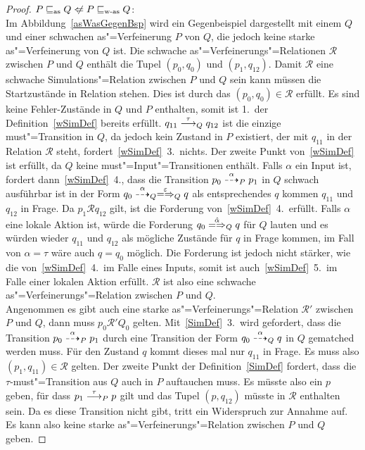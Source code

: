 \begin{proof}
  $P\asRel Q\hspace{0.1cm}\not\hspace{-0.1cm}\Leftarrow P\wasRel Q$:\\
  Im Abbildung~\ref{asWasGegenBsp} wird ein Gegenbeispiel dargestellt mit einem
  \MEIO{} $Q$ und einer schwachen as"=Verfeinerung $P$ von $Q$, die jedoch
  keine starke as"=Verfeinerung von $Q$ ist. Die schwache
  as"=Verfeinerungs"=Relationen $\mathcal{R}$ zwischen $P$ und $Q$ enthält die
  Tupel $(p_0,q_0)$ und $(p_1,q_{12})$. Damit $\mathcal{R}$ eine schwache
  Simulations"=Relation zwischen $P$ und $Q$ sein kann müssen die Startzustände
  in Relation stehen. Dies ist durch das $(p_0,q_0)\in \mathcal{R}$ erfüllt.
  Es sind keine Fehler-Zustände in $Q$ und $P$ enthalten, somit ist 1.\ der
  Definition~\ref{wSimDef} bereits erfüllt. $q_{11} \must[\tau]_Q q_{12}$ ist
  die einzige must"=Transition in $Q$, da jedoch kein Zustand in $P$ existiert,
  der mit $q_{11}$ in der Relation $\mathcal{R}$ steht,
  fordert~\ref{wSimDef}~3.\ nichts. Der zweite Punkt von~\ref{wSimDef} ist
  erfüllt, da $Q$ keine must"=Input"=Transitionen enthält. Falls $\alpha$ ein
  Input ist, fordert dann~\ref{wSimDef}~4., dass die Transition $p_0
  \may[\alpha]_P p_1$ in $Q$ schwach ausführbar ist in der Form $q_0
  \may[\alpha]_Q \weakmay[\varepsilon]_Q q$ als entsprechendes $q$ kommen
  $q_{11}$ und $q_{12}$ in Frage. Da $p_1 \mathcal{R} q_{12}$ gilt, ist die
  Forderung von~\ref{wSimDef}~4.\ erfüllt. Falls $\alpha$ eine lokale Aktion
  ist, würde die Forderung $q_0 \weakmay[\hat{\alpha}]_Q q$ für $Q$ lauten und
  es würden wieder $q_{11}$ und $q_{12}$ als mögliche Zustände für $q$ in Frage
  kommen, im Fall von $\alpha = \tau$ wäre auch $q = q_0$ möglich. Die
  Forderung ist jedoch nicht stärker, wie die von~\ref{wSimDef}~4.\ im Falle
  eines Inputs, somit ist auch~\ref{wSimDef}~5.\ im Falle einer lokalen Aktion
  erfüllt. $\mathcal{R}$ ist also eine schwache as"=Verfeinerungs"=Relation
  zwischen $P$ und $Q$.\\
  Angenommen es gibt auch eine starke as"=Verfeinerungs"=Relation
  $\mathcal{R}'$ zwischen $P$ und $Q$, dann muss $p_0 \mathcal{R}' Q_0$
  gelten. Mit~\ref{SimDef}~3.\ wird gefordert, dass die Transition $p_0
  \may[\alpha]_P p_1$ durch eine Transition der Form $q_0 \may[\alpha]_Q q$
  in $Q$ gematched werden muss. Für den Zustand $q$ kommt dieses mal nur
  $q_{11}$ in Frage. Es muss also $(p_1,q_{11})\in \mathcal{R}$ gelten. Der
  zweite Punkt der Definition~\ref{SimDef} fordert, dass die
  $\tau$-must"=Transition aus $Q$ auch in $P$ auftauchen muss. Es müsste also
  ein $p$ geben, für dass $p_1 \must[\tau]_P p$ gilt und das Tupel $(p,q_{12})$
  müsste in $\mathcal{R}$ enthalten sein. Da es diese Transition nicht gibt,
  tritt ein Widerspruch zur Annahme auf. Es kann also keine starke
  as"=Verfeinerungs"=Relation zwischen $P$ und $Q$ geben.


\end{proof}
